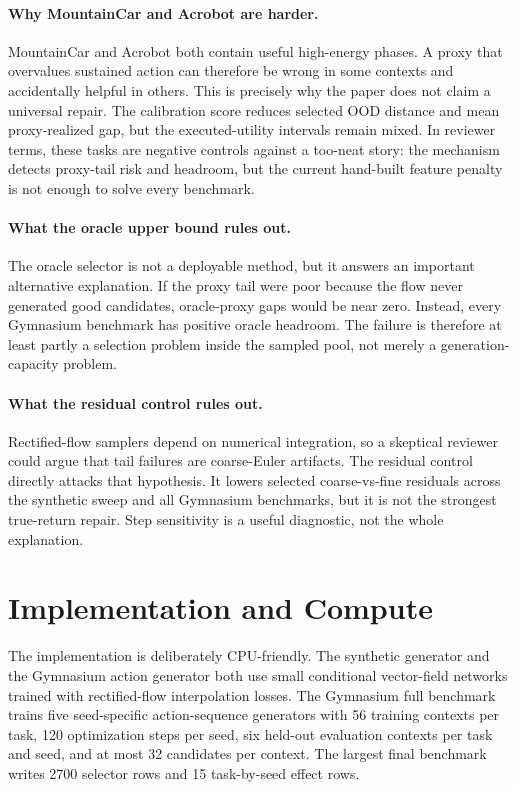 \documentclass[10pt]{article}
\begin{document}
\paragraph{Why MountainCar and Acrobot are harder.}
MountainCar and Acrobot both contain useful high-energy phases. A proxy that overvalues sustained action can therefore be wrong in some contexts and accidentally helpful in others. This is precisely why the paper does not claim a universal repair. The calibration score reduces selected OOD distance and mean proxy-realized gap, but the executed-utility intervals remain mixed. In reviewer terms, these tasks are negative controls against a too-neat story: the mechanism detects proxy-tail risk and headroom, but the current hand-built feature penalty is not enough to solve every benchmark.

\paragraph{What the oracle upper bound rules out.}
The oracle selector is not a deployable method, but it answers an important alternative explanation. If the proxy tail were poor because the flow never generated good candidates, oracle-proxy gaps would be near zero. Instead, every Gymnasium benchmark has positive oracle headroom. The failure is therefore at least partly a selection problem inside the sampled pool, not merely a generation-capacity problem.

\paragraph{What the residual control rules out.}
Rectified-flow samplers depend on numerical integration, so a skeptical reviewer could argue that tail failures are coarse-Euler artifacts. The residual control directly attacks that hypothesis. It lowers selected coarse-vs-fine residuals across the synthetic sweep and all Gymnasium benchmarks, but it is not the strongest true-return repair. Step sensitivity is a useful diagnostic, not the whole explanation.

\section{Implementation and Compute}

The implementation is deliberately CPU-friendly. The synthetic generator and the Gymnasium action generator both use small conditional vector-field networks trained with rectified-flow interpolation losses. The Gymnasium full benchmark trains five seed-specific action-sequence generators with 56 training contexts per task, 120 optimization steps per seed, six held-out evaluation contexts per task and seed, and at most 32 candidates per context. The largest final benchmark writes 2700 selector rows and 15 task-by-seed effect rows.
\end{document}
